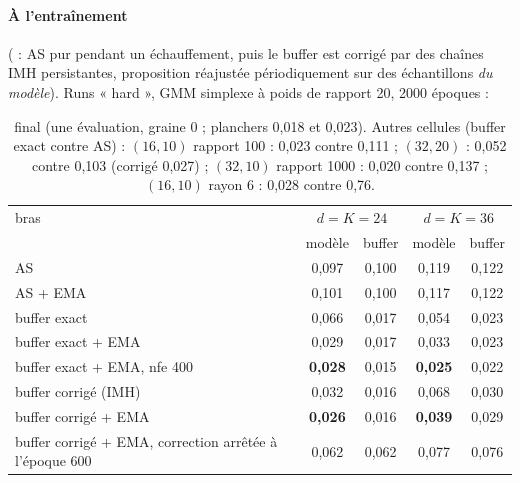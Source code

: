 \paragraph{À l'entraînement} ( : AS pur pendant un échauffement, puis le buffer est corrigé par des chaînes IMH persistantes, proposition réajustée périodiquement sur des échantillons \emph{du modèle}). Runs « hard », GMM simplexe à poids de rapport 20, 2000 époques :
\begin{table}[h]\centering\small
\begin{tabular}{lcccc}\toprule
bras & \multicolumn{2}{c}{$d=K=24$} & \multicolumn{2}{c}{$d=K=36$}\\
 & modèle & buffer & modèle & buffer\\\midrule
AS & 0,097 & 0,100 & 0,119 & 0,122\\
AS + EMA & 0,101 & 0,100 & 0,117 & 0,122\\
buffer exact & 0,066 & 0,017 & 0,054 & 0,023\\
buffer exact + EMA & 0,029 & 0,017 & 0,033 & 0,023\\
buffer exact + EMA, nfe 400 & \textbf{0,028} & 0,015 & \textbf{0,025} & 0,022\\
buffer corrigé (IMH) & 0,032 & 0,016 & 0,068 & 0,030\\
buffer corrigé + EMA & \textbf{0,026} & 0,016 & \textbf{0,039} & 0,029\\
buffer corrigé + EMA, correction arrêtée à l'époque 600 & 0,062 & 0,062 & 0,077 & 0,076\\\bottomrule
\end{tabular}
\caption{ final (une évaluation, graine 0 ; planchers 0,018 et 0,023). Autres cellules (buffer exact contre AS) : $(16,10)$ rapport 100 : 0,023 contre 0,111 ; $(32,20)$ : 0,052 contre 0,103 (corrigé 0,027) ; $(32,10)$ rapport 1000 : 0,020 contre 0,137 ; $(16,10)$ rayon 6 : 0,028 contre 0,76.}
\end{table}
